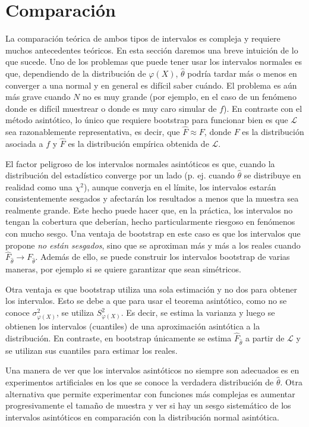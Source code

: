 \documentclass[11pt]{article}
\newcommand\LL{\mathcal{L}}
\begin{document}
\section*{Comparación}

La comparación teórica de ambos tipos de intervalos es compleja y requiere muchos antecedentes teóricos. En esta sección daremos una breve intuición de lo que sucede. Uno de los problemas que puede tener usar los intervalos normales es que, dependiendo de la distribución de $\varphi(X)$, $\hat\theta$ podría tardar más o menos en converger a una normal y en general es difícil saber cuándo. El problema es aún más grave cuando $N$ no es muy grande (por ejemplo, en el caso de un fenómeno donde es difícil muestrear o donde es muy caro simular de $f$). En contraste con el método asintótico, lo único que requiere bootstrap para funcionar bien es que $\LL$ sea razonablemente representativa, es decir, que $\hat{F} \approx F$, donde $F$ es la distribución asociada a $f$ y $\hat{F}$ es la distribución empírica obtenida de $\LL$.

El factor peligroso de los intervalos normales asintóticos es que, cuando la distribución del estadístico converge por un lado (p. ej. cuando $\hat\theta$ se distribuye en realidad como una $\chi^2$), aunque converja en el límite, los intervalos estarán consistentemente sesgados y afectarán los resultados a menos que la muestra sea realmente grande. Este hecho puede hacer que, en la práctica, los intervalos no tengan la cobertura que deberían, hecho particularmente riesgoso en fenómenos con mucho sesgo. Una ventaja de bootstrap en este caso es que los intervalos que propone \emph{no están sesgados}, sino que se aproximan más y más a los reales cuando $\hat{F}_{\hat\theta} \rightarrow F_{\hat\theta}$. Además de ello, se puede construir los intervalos bootstrap de varias maneras, por ejemplo si se quiere garantizar que sean simétricos.

Otra ventaja es que bootstrap utiliza una sola estimación y no dos para obtener los intervalos. Esto se debe a que para usar el teorema asintótico, como no se conoce $\sigma_{\varphi(X)}^2$, se utiliza $S_{\varphi(X)}^2$. Es decir, se estima la varianza y luego se obtienen los intervalos (cuantiles) de una aproximación asintótica a la distribución. En contraste, en bootstrap únicamente se estima $\hat{F}_{\hat\theta}$ a partir de $\LL$ y se utilizan sus cuantiles para estimar los reales.

Una manera de ver que los intervalos asintóticos no siempre son adecuados es en experimentos artificiales en los que se conoce la verdadera distribución de $\hat\theta$. Otra alternativa que permite experimentar con funciones más complejas es aumentar progresivamente el tamaño de muestra y ver si hay un sesgo sistemático de los intervalos asintóticos en comparación con la distribución normal asintótica.
\end{document}
